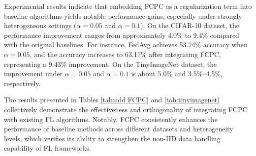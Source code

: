 \documentclass[journal,twoside,web]{ieeecolor}
\begin{document}
Experimental results indicate that embedding FCPC as a regularization term into baseline algorithms yields notable performance gains, especially under strongly heterogeneous settings (\( \alpha = 0.05 \) and \( \alpha = 0.1 \)). On the CIFAR-10 dataset, the performance improvement ranges from approximately 4.0\% to 9.4\% compared with the original baselines. For instance, FedAvg achieves 53.74\% accuracy when \( \alpha = 0.05 \), and the accuracy increases to 63.17\% after integrating FCPC, representing a 9.43\% improvement. On the TinyImageNet dataset, the improvement under \( \alpha = 0.05 \) and \( \alpha = 0.1 \) is about 5.0\% and 3.5\%–4.5\%, respectively.


The results presented in Tables \ref{tab:add FCPC} and \ref{tab:tinyimagenet} collectively demonstrate the effectiveness and orthogonality of integrating FCPC with existing FL algorithms. Notably, FCPC consistently enhances the performance of baseline methods across different datasets and heterogeneity levels, which verifies its ability to strengthen the non-IID data handling capability of FL frameworks.
\end{document}
